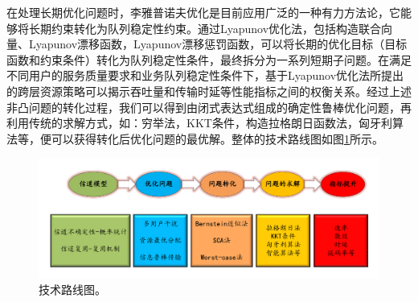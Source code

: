 \textcolor[RGB]{202,12,22}{
在处理长期优化问题时，李雅普诺夫优化是目前应用广泛的一种有力方法论，它能够将长期约束转化为队列稳定性约束。通过Lyapunov优化法，包括构造联合向量、Lyapunov漂移函数，Lyapunov漂移惩罚函数，可以将长期的优化目标（目标函数和约束条件）转化为队列稳定性条件，最终拆分为一系列短期子问题。在满足不同用户的服务质量要求和业务队列稳定性条件下，基于Lyapunov优化法所提出的跨层资源策略可以揭示吞吐量和传输时延等性能指标之间的权衡关系。经过上述非凸问题的转化过程，我们可以得到由闭式表达式组成的确定性鲁棒优化问题，再利用传统的求解方式，如：穷举法，KKT条件，构造拉格朗日函数法，匈牙利算法等，便可以获得转化后优化问题的最优解。整体的技术路线图如图\ref{技术路线图}所示。}

\begin{figure}[H]
\centering
\includegraphics[width=16cm]{figures//chap1//技术路线图.pdf}
\caption{技术路线图。}
\label{技术路线图}
\end{figure}

